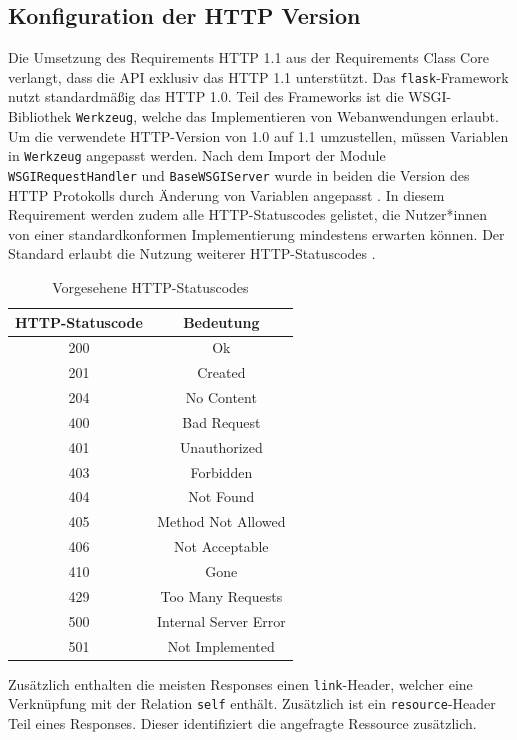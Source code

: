 \subsection{Konfiguration der HTTP Version}
Die Umsetzung des Requirements HTTP 1.1 aus der Requirements Class Core verlangt, dass die API exklusiv das HTTP 1.1 unterstützt. 
Das \verb|flask|-Framework nutzt standardmäßig das HTTP 1.0. Teil des Frameworks ist die WSGI-Bibliothek \verb|Werkzeug|, welche
das Implementieren von Webanwendungen erlaubt. Um die verwendete HTTP-Version von 1.0 auf 1.1 umzustellen, müssen Variablen 
in \verb|Werkzeug| angepasst werden. Nach dem Import der Module \verb|WSGIRequestHandler| und \verb|BaseWSGIServer| wurde in beiden die 
Version des HTTP Protokolls durch Änderung von Variablen angepasst \cite{code}. 
In diesem Requirement werden zudem alle HTTP-Statuscodes gelistet, die Nutzer*innen von einer standardkonformen Implementierung mindestens erwarten können. 
Der Standard erlaubt die Nutzung weiterer HTTP-Statuscodes \cite{ogc_api_processes_core}.
 
\begin{table}[H]
    \caption{Vorgesehene HTTP-Statuscodes \cite{ogc_api_processes_core}}
    \centering
    \begin{tabular}{c c} 
        HTTP-Statuscode & Bedeutung\\ 
        \hline
        200 & Ok\\
        201 & Created\\
        204 & No Content\\
        400 & Bad Request\\
        401 & Unauthorized\\
        403 & Forbidden\\
        404 & Not Found\\
        405 & Method Not Allowed\\
        406 & Not Acceptable\\
        410 & Gone\\
        429 & Too Many Requests\\
        500 & Internal Server Error\\
        501 & Not Implemented\\
    \end{tabular}\label{httpcodes}
\end{table}

Zusätzlich enthalten die meisten Responses einen \verb|link|-Header,
welcher eine Verknüpfung mit der Relation \verb|self| enthält. Zusätzlich ist ein \verb|resource|-Header Teil eines Responses. Dieser 
identifiziert die angefragte Ressource zusätzlich.


